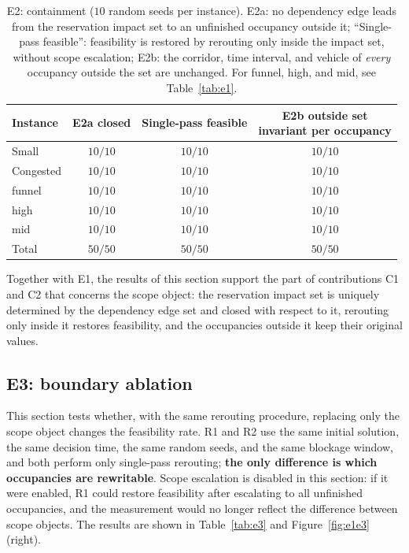 \documentclass[manuscript,screen,review]{acmart}
\newcommand{\NSeeds}{10}
\newcommand{\NPairs}{50}
\newcommand{\PassClosed}{\NPairs/\NPairs}    %
\newcommand{\PassInvar}{\NPairs/\NPairs}     %
\begin{document}
\begin{table}[t]
\centering
\caption{E2: containment (\(\NSeeds\) random seeds per instance). E2a: no dependency edge leads from the reservation impact set to an unfinished occupancy outside it;
``Single-pass feasible'': feasibility is restored by rerouting only inside the impact set, without scope escalation;
E2b: the corridor, time interval, and vehicle of \emph{every} occupancy outside the set are unchanged. For funnel, high, and mid, see Table~\ref{tab:e1}.}
\label{tab:e2}
\small
\begin{tabular}{@{}lccc@{}}
\toprule
Instance & E2a closed & Single-pass feasible & \makecell{E2b outside set\\invariant per occupancy} \\
\midrule
Small      & \(10/10\) & \(10/10\) & \(10/10\) \\
Congested  & \(10/10\) & \(10/10\) & \(10/10\) \\
funnel  & \(10/10\) & \(10/10\) & \(10/10\) \\
high    & \(10/10\) & \(10/10\) & \(10/10\) \\
mid     & \(10/10\) & \(10/10\) & \(10/10\) \\
\midrule
Total & \(\PassClosed\) & \(\NPairs/\NPairs\) & \(\PassInvar\) \\
\bottomrule
\end{tabular}
\end{table}

Together with E1, the results of this section support the part of contributions C1 and C2 that concerns the scope object: the reservation impact set is uniquely determined by the dependency edge set and closed with respect to it,
rerouting only inside it restores feasibility, and the occupancies outside it keep their original values.


\subsection{E3: boundary ablation}
\label{sec:e3}

This section tests whether, with the same rerouting procedure, replacing only the scope object changes the feasibility rate.
R1 and R2 use the same initial solution, the same decision time, the same random seeds, and the same blockage window, and both perform only single-pass rerouting;
\textbf{the only difference is which occupancies are rewritable}. Scope escalation is disabled in this section: if it were enabled, R1 could restore feasibility after escalating to all unfinished occupancies,
and the measurement would no longer reflect the difference between scope objects. The results are shown in Table~\ref{tab:e3} and Figure~\ref{fig:e1e3} (right).
\end{document}
